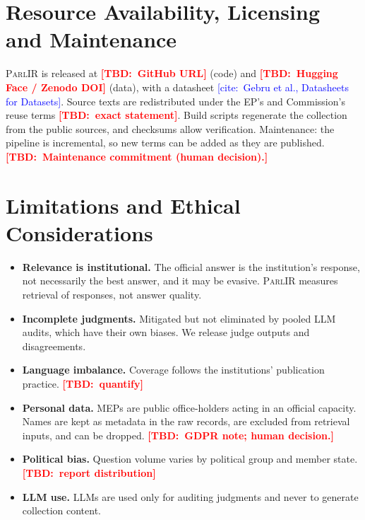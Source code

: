 \documentclass[runningheads]{llncs}
\newcommand{\TBD}[1]{\textcolor{red}{\textbf{[TBD:~#1]}}}
\newcommand{\CITE}[1]{\textcolor{blue}{[cite:~#1]}}
\newcommand{\TBD}[1]{\errmessage{Unresolved TBD: #1}}
\newcommand{\CITE}[1]{\errmessage{Unverified citation: #1}}
\newcommand{\parlir}{\textsc{ParlIR}}
\begin{document}
\section{Resource Availability, Licensing and Maintenance}\label{sec:release}
\parlir{} is released at \TBD{GitHub URL} (code) and \TBD{Hugging Face / Zenodo DOI}
(data), with a datasheet \CITE{Gebru et al., Datasheets for Datasets}.
Source texts are redistributed under the EP's and Commission's reuse terms
\TBD{exact statement}. Build scripts regenerate the collection from the
public sources, and checksums allow verification. Maintenance: the pipeline
is incremental, so new terms can be added as they are published.
\TBD{Maintenance commitment (human decision).}

\section{Limitations and Ethical Considerations}\label{sec:limits}
\begin{itemize}
\item \textbf{Relevance is institutional.} The official answer is the
  institution's response, not necessarily the best answer, and it may be
  evasive. \parlir{} measures retrieval of responses, not answer quality.
\item \textbf{Incomplete judgments.} Mitigated but not eliminated by
  pooled LLM audits, which have their own biases. We release judge outputs
  and disagreements.
\item \textbf{Language imbalance.} Coverage follows the institutions'
  publication practice. \TBD{quantify}
\item \textbf{Personal data.} MEPs are public office-holders acting in an
  official capacity. Names are kept as metadata in the raw records, are
  excluded from retrieval inputs, and can be dropped.
  \TBD{GDPR note; human decision.}
\item \textbf{Political bias.} Question volume varies by political group and
  member state. \TBD{report distribution}
\item \textbf{LLM use.} LLMs are used only for auditing judgments and
  never to generate collection content.
\end{itemize}
\end{document}
